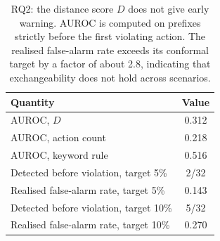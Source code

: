 \begin{table}[t]
\caption{RQ2: the distance score $D$ does not give early warning. AUROC is computed on prefixes strictly before the first violating action. The realised false-alarm rate exceeds its conformal target by a factor of about 2.8, indicating that exchangeability does not hold across scenarios.}
\label{tab:rq2}
\vskip 0.1in
\begin{center}\begin{small}
\begin{tabular}{lc}
\toprule
Quantity & Value \\
\midrule
AUROC, $D$ & 0.312 \\
AUROC, action count & 0.218 \\
AUROC, keyword rule & 0.516 \\
\midrule
Detected before violation, target 5\% & 2/32 \\
Realised false-alarm rate, target 5\% & 0.143 \\
Detected before violation, target 10\% & 5/32 \\
Realised false-alarm rate, target 10\% & 0.270 \\
\bottomrule
\end{tabular}
\end{small}\end{center}
\vskip -0.1in
\end{table}
